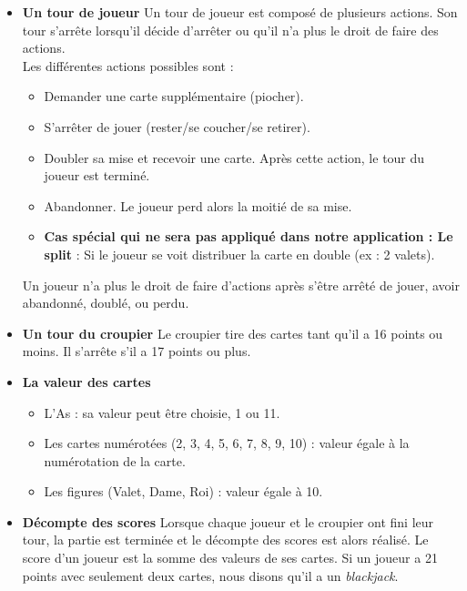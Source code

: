\begin{itemize}
    
    \item \textbf{Un tour de joueur} \newline
    Un tour de joueur est composé de plusieurs actions. Son tour s'arrête lorsqu'il décide d'arrêter ou qu'il n'a plus le droit de faire des actions.\\
    Les différentes actions possibles sont :
    \begin{itemize}
        \item Demander une carte supplémentaire (piocher).
        \item S'arrêter de jouer (rester/se coucher/se retirer).
        \item Doubler sa mise et recevoir une carte. Après cette action, le tour du joueur est terminé.
        \item Abandonner. Le joueur perd alors la moitié de sa mise.
        \item \textbf{Cas spécial qui ne sera pas appliqué dans notre application : Le split} : Si le joueur se voit distribuer la carte en double (ex : 2 valets).
    \end{itemize}
    Un joueur n'a plus le droit de faire d'actions après s'être arrêté de jouer, avoir abandonné, doublé, ou perdu.
    
    \item \textbf{Un tour du croupier} \newline
    Le croupier tire des cartes tant qu'il a 16 points ou moins. Il s'arrête s'il a 17 points ou plus.

    \item \textbf{La valeur des cartes} 
    \begin{itemize}
        \item L'As : sa valeur peut être choisie, 1 ou 11.
        \item Les cartes numérotées (2, 3, 4, 5, 6, 7, 8, 9, 10) : valeur égale à la numérotation de la carte.
        \item Les figures (Valet, Dame, Roi) : valeur égale à 10.
    \end{itemize}

    \item \textbf{Décompte des scores} \newline
    Lorsque chaque joueur et le croupier ont fini leur tour, la partie est terminée et le décompte des scores est alors réalisé.
    Le score d'un joueur est la somme des valeurs de ses cartes.
    Si un joueur a 21 points avec seulement deux cartes, nous disons qu'il a un \textit{blackjack}.
    

\end{itemize}
